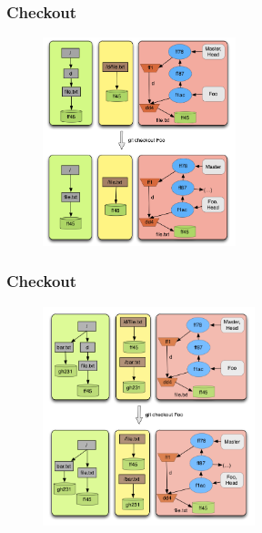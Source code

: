 \documentclass{beamer}
\begin{document}
\begin{frame}[fragile]
   \frametitle{Checkout}
   \begin{figure}
      \centering
      \includegraphics[width=0.50\textwidth]{images/checkout.png}
   \end{figure}
\end{frame}
\begin{frame}[fragile]
   \frametitle{Checkout}
   \begin{figure}
      \centering
      \includegraphics[width=0.55\textwidth]{images/notsosimplecheckout.png}
   \end{figure}
\end{frame}
\end{document}
